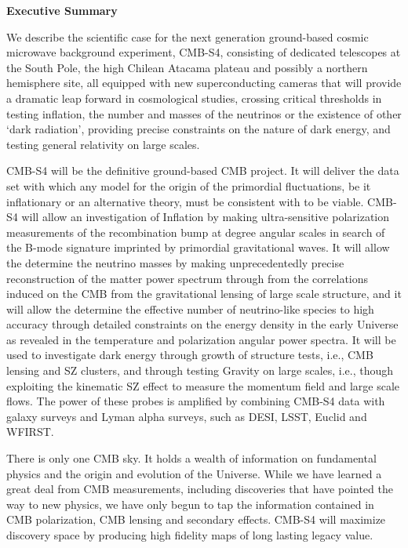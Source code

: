 \begin{center}
  {\Large \bf Executive Summary}
\end{center}

We describe the scientific case for the next generation ground-based cosmic microwave background experiment, CMB-S4, consisting of dedicated telescopes at the South Pole, the high Chilean Atacama plateau and possibly a northern hemisphere site, all equipped with new superconducting cameras that will provide a dramatic leap forward in cosmological studies, crossing critical thresholds in testing inflation, the number and masses of the neutrinos or the existence of other `dark radiation', providing precise constraints on the nature of dark energy, and testing general relativity on large scales. 

CMB-S4 will be the definitive ground-based CMB project. It will deliver the data set with which any model for the origin of the primordial fluctuations, be it inflationary or an alternative theory, must be consistent with to be viable.  CMB-S4 will allow an investigation of Inflation by making ultra-sensitive polarization measurements of the recombination bump at degree angular scales in search of the B-mode signature imprinted by primordial gravitational waves. It will allow the determine the neutrino masses by making unprecedentedly precise reconstruction of the matter power spectrum through from the correlations induced on the CMB from the gravitational lensing of large scale structure, and it will allow the determine the effective number of neutrino-like species to high accuracy through detailed constraints on the energy density in the early Universe as revealed in the temperature and polarization angular power spectra.
It will be used to investigate dark energy through growth of structure tests, i.e., CMB lensing and SZ clusters, and through testing Gravity on large scales, i.e., though exploiting the kinematic SZ effect to measure the momentum field and large scale flows. The power of these probes is amplified by combining CMB-S4 data with galaxy surveys and Lyman alpha surveys, such as DESI, LSST, Euclid and WFIRST.

There is only one CMB sky. It holds a wealth of information on fundamental physics and the origin and evolution of the Universe. While we have learned a great deal from CMB measurements, including discoveries that have pointed the way to new physics, we have only begun to tap the information contained in CMB polarization, CMB lensing and secondary effects. CMB-S4 will  maximize discovery space by producing high fidelity maps of long lasting legacy value.

